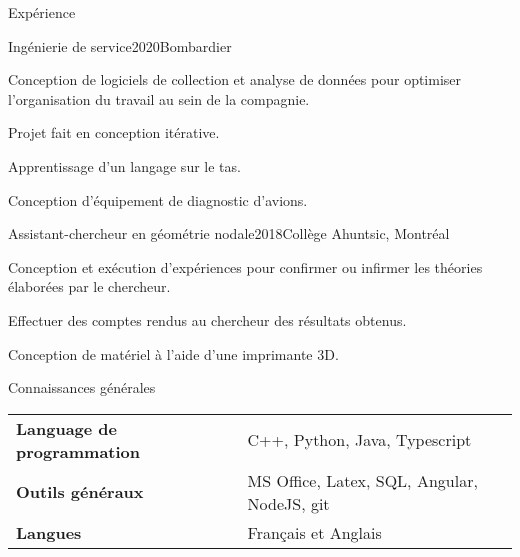 \documentclass[french,12pt]{resume} %
\begin{document}
	\begin{rSection}{Expérience}
		
		\begin{rSubsection}{Ingénierie de service}{2020}{Bombardier}{}{}
			\item Conception de logiciels de collection et analyse de données pour optimiser l'organisation du travail au sein de la compagnie.
			\item Projet fait en conception itérative. 
			\item Apprentissage d'un langage sur le tas.
			\item Conception d'équipement de diagnostic d'avions.
		\end{rSubsection}
		
		\begin{rSubsection}{Assistant-chercheur en géométrie nodale}{2018}{Collège Ahuntsic, Montréal}{}
			\item 	Conception et exécution d'expériences pour confirmer ou infirmer les théories élaborées par le chercheur.
			\item   Effectuer des comptes rendus au chercheur des résultats obtenus.
			\item   Conception de matériel à l’aide d’une imprimante 3D.
		\end{rSubsection}
		
		
	\end{rSection}
	
	

	
	\begin{rSection}{Connaissances générales}
		
		\begin{tabular}{ @{} >{\bfseries}l @{\hspace{6ex}} l }
			Language de programmation \              & C++, Python, Java, Typescript \\
			Outils généraux                 & MS Office, Latex, SQL, Angular, NodeJS, git \\
			Langues & Français et Anglais
		\end{tabular}
		
	\end{rSection}
	
	
\end{document}
